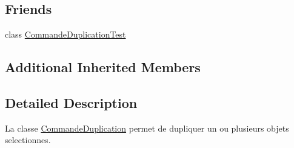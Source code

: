 \subsection*{Friends}
\begin{DoxyCompactItemize}
\item 
class \hyperlink{class_commande_duplication_a56556d420bb3ba15607139fbe14fb3ee}{Commande\-Duplication\-Test}
\end{DoxyCompactItemize}
\subsection*{Additional Inherited Members}


\subsection{Detailed Description}
La classe \hyperlink{class_commande_duplication}{Commande\-Duplication} permet de dupliquer un ou plusieurs objets selectionnes. 

